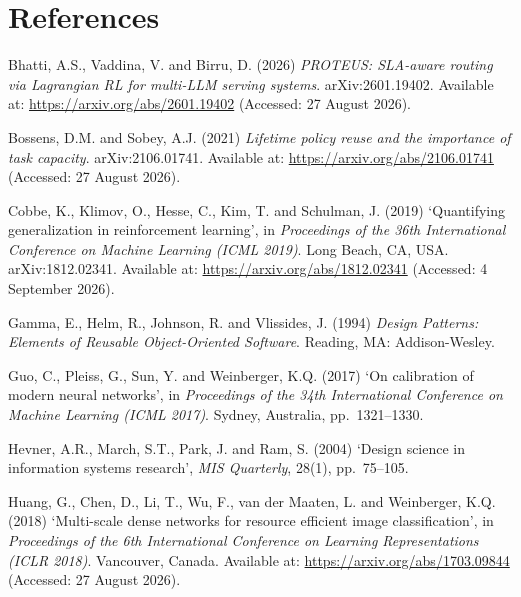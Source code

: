 \hypertarget{references}{%
\section{References}\label{references}}

\begin{list}{}{\setlength{\leftmargin}{1.5em}\setlength{\itemindent}{-1.5em}\setlength{\itemsep}{0.6em}\setlength{\parsep}{0pt}}

\item Bhatti, A.S., Vaddina, V. and Birru, D. (2026) \emph{PROTEUS: SLA-aware routing via Lagrangian RL for multi-LLM serving systems}. arXiv:2601.19402. Available at: \url{https://arxiv.org/abs/2601.19402} (Accessed: 27 August 2026).

\item Bossens, D.M. and Sobey, A.J. (2021) \emph{Lifetime policy reuse and the importance of task capacity}. arXiv:2106.01741. Available at: \url{https://arxiv.org/abs/2106.01741} (Accessed: 27 August 2026).

\item Cobbe, K., Klimov, O., Hesse, C., Kim, T. and Schulman, J. (2019) `Quantifying generalization in reinforcement learning', in \emph{Proceedings of the 36th International Conference on Machine Learning (ICML 2019)}. Long Beach, CA, USA. arXiv:1812.02341. Available at: \url{https://arxiv.org/abs/1812.02341} (Accessed: 4 September 2026).

\item Gamma, E., Helm, R., Johnson, R. and Vlissides, J. (1994) \emph{Design Patterns: Elements of Reusable Object-Oriented Software}. Reading, MA: Addison-Wesley.

\item Guo, C., Pleiss, G., Sun, Y. and Weinberger, K.Q. (2017) `On calibration of modern neural networks', in \emph{Proceedings of the 34th International Conference on Machine Learning (ICML 2017)}. Sydney, Australia, pp.~1321--1330.

\item Hevner, A.R., March, S.T., Park, J. and Ram, S. (2004) `Design science in information systems research', \emph{MIS Quarterly}, 28(1), pp.~75--105.

\item Huang, G., Chen, D., Li, T., Wu, F., van der Maaten, L. and Weinberger, K.Q. (2018) `Multi-scale dense networks for resource efficient image classification', in \emph{Proceedings of the 6th International Conference on Learning Representations (ICLR 2018)}. Vancouver, Canada. Available at: \url{https://arxiv.org/abs/1703.09844} (Accessed: 27 August 2026).


\end{list}
